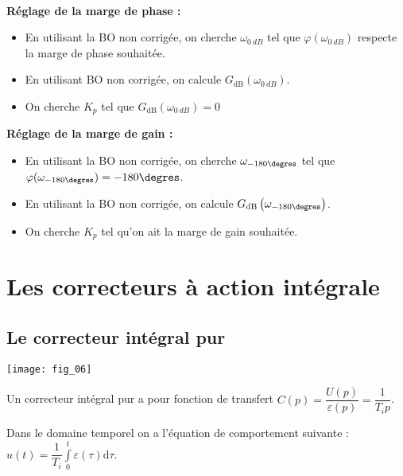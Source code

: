 \begin{methode} ~\\
\vspace{-1cm}
\begin{multicols}{2}
\textbf{Réglage de la marge de phase :}
\begin{itemize}
\item En utilisant la BO non corrigée, on cherche $\omega_{\SI{0}{dB}}$ tel que $\varphi(\omega_{\SI{0}{dB}})$ respecte la marge de phase souhaitée. 
\item En utilisant BO non corrigée, on calcule $G_{\text{dB}}\left(\omega_{\SI{0}{dB}}\right)$. 
\item On cherche $K_p$ tel que $G_{\text{dB}}\left(\omega_{\SI{0}{dB}}\right)=0$
\end{itemize}
\vspace{.25cm}

\vfill

\textbf{Réglage de la marge de gain :}
\begin{itemize}
\item En utilisant la BO non corrigée, on cherche $\omega_{-180\degres}$ tel que $\varphi(\omega_{-180\degres})=-180\degres$.
\item En utilisant la BO non corrigée, on calcule $G_{\text{dB}}\left(\omega_{-180\degres}\right)$. 
\item On cherche $K_p$ tel qu'on ait la marge de gain souhaitée.
\end{itemize}
\end{multicols}
\end{methode}

\section{Les correcteurs à action intégrale}
\subsection{Le correcteur intégral pur}


\begin{marginfigure}
\texttt{[image: fig\_06]}
\end{marginfigure}

\begin{defi}[Correcteur I]
Un correcteur intégral pur a pour fonction de transfert $C(p)=\dfrac{U(p)}{\varepsilon(p)}=\dfrac{1}{T_i p}$.

Dans le domaine temporel on a l'équation de comportement suivante : $u(t)=\dfrac{1}{T_i}\int\limits_0^t \varepsilon (\tau)\text{d}\tau$.
\end{defi}


